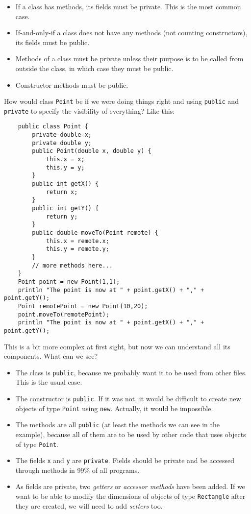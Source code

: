 \begin{itemize}
\item If a class has methods, its fields must be private. This is the
  most common case. 
\item If-and-only-if a class does not have any methods (not counting
  constructors), its fields must be public.
\item Methods of a class must be private unless their purpose is to be
  called from outside the class, in which case they must be public.
\item Constructor methods must be public. 
\end{itemize}

How would class \verb+Point+ be if we were doing things right and
using \verb+public+ and \verb+private+ to specify the visibility of
everything? Like this: 

\begin{verbatim}
    public class Point {
        private double x;
        private double y;
        public Point(double x, double y) {
            this.x = x;
            this.y = y;
        }
        public int getX() {
            return x;
        }
        public int getY() {
            return y;
        }
        public double moveTo(Point remote) {
            this.x = remote.x;
            this.y = remote.y;
        }
        // more methods here...
    }
    Point point = new Point(1,1);
    println "The point is now at " + point.getX() + "," + point.getY();
    Point remotePoint = new Point(10,20);
    point.moveTo(remotePoint);
    println "The point is now at " + point.getX() + "," + point.getY();
\end{verbatim}

This is a bit more complex at first sight, but now we can understand
all its components. What can we see?

\begin{itemize}
\item The class is \verb+public+, because we probably want it to be
  used from other files. This is the usual case.
\item The constructor is \verb+public+. If it was not, it would be
  difficult to create new objects of type \verb+Point+ using
  \verb+new+. Actually, it would be impossible.
\item The methods are all \verb+public+ (at least the methods we can
  see in the example), because all of them are to be used by other
  code that uses objects of type \verb+Point+.
\item The fields \verb+x+ and \verb+y+ are \verb+private+. Fields
  should be private and be accessed through methods in 99\% of all
  programs.
\item As fields are private, two \emph{getters} or \emph{accessor
    methods} have been added. If we want to be able to modify the
  dimensions of objects of type \verb+Rectangle+ after they are
  created, we will need to add \emph{setters} too. 
\end{itemize}

